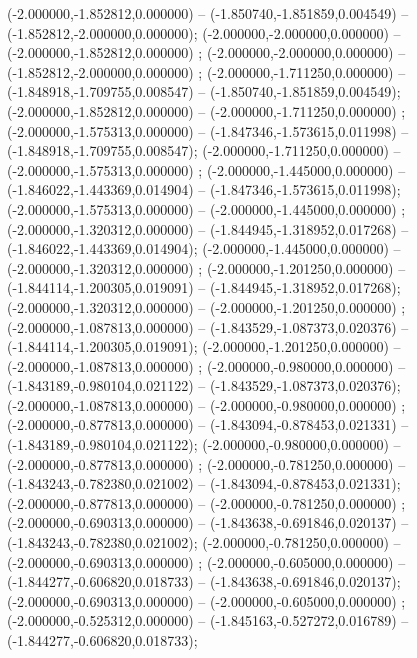  (-2.000000,-1.852812,0.000000) -- (-1.850740,-1.851859,0.004549) -- (-1.852812,-2.000000,0.000000);
 (-2.000000,-2.000000,0.000000) -- (-2.000000,-1.852812,0.000000) ;
 (-2.000000,-2.000000,0.000000) -- (-1.852812,-2.000000,0.000000) ;
 (-2.000000,-1.711250,0.000000) -- (-1.848918,-1.709755,0.008547) -- (-1.850740,-1.851859,0.004549);
 (-2.000000,-1.852812,0.000000) -- (-2.000000,-1.711250,0.000000) ;
 (-2.000000,-1.575313,0.000000) -- (-1.847346,-1.573615,0.011998) -- (-1.848918,-1.709755,0.008547);
 (-2.000000,-1.711250,0.000000) -- (-2.000000,-1.575313,0.000000) ;
 (-2.000000,-1.445000,0.000000) -- (-1.846022,-1.443369,0.014904) -- (-1.847346,-1.573615,0.011998);
 (-2.000000,-1.575313,0.000000) -- (-2.000000,-1.445000,0.000000) ;
 (-2.000000,-1.320312,0.000000) -- (-1.844945,-1.318952,0.017268) -- (-1.846022,-1.443369,0.014904);
 (-2.000000,-1.445000,0.000000) -- (-2.000000,-1.320312,0.000000) ;
 (-2.000000,-1.201250,0.000000) -- (-1.844114,-1.200305,0.019091) -- (-1.844945,-1.318952,0.017268);
 (-2.000000,-1.320312,0.000000) -- (-2.000000,-1.201250,0.000000) ;
 (-2.000000,-1.087813,0.000000) -- (-1.843529,-1.087373,0.020376) -- (-1.844114,-1.200305,0.019091);
 (-2.000000,-1.201250,0.000000) -- (-2.000000,-1.087813,0.000000) ;
 (-2.000000,-0.980000,0.000000) -- (-1.843189,-0.980104,0.021122) -- (-1.843529,-1.087373,0.020376);
 (-2.000000,-1.087813,0.000000) -- (-2.000000,-0.980000,0.000000) ;
 (-2.000000,-0.877813,0.000000) -- (-1.843094,-0.878453,0.021331) -- (-1.843189,-0.980104,0.021122);
 (-2.000000,-0.980000,0.000000) -- (-2.000000,-0.877813,0.000000) ;
 (-2.000000,-0.781250,0.000000) -- (-1.843243,-0.782380,0.021002) -- (-1.843094,-0.878453,0.021331);
 (-2.000000,-0.877813,0.000000) -- (-2.000000,-0.781250,0.000000) ;
 (-2.000000,-0.690313,0.000000) -- (-1.843638,-0.691846,0.020137) -- (-1.843243,-0.782380,0.021002);
 (-2.000000,-0.781250,0.000000) -- (-2.000000,-0.690313,0.000000) ;
 (-2.000000,-0.605000,0.000000) -- (-1.844277,-0.606820,0.018733) -- (-1.843638,-0.691846,0.020137);
 (-2.000000,-0.690313,0.000000) -- (-2.000000,-0.605000,0.000000) ;
 (-2.000000,-0.525312,0.000000) -- (-1.845163,-0.527272,0.016789) -- (-1.844277,-0.606820,0.018733);
